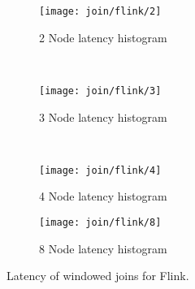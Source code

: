 \begin{figure*}
    \centering
    \begin{subfigure}[b]{0.49\textwidth}
        \texttt{[image: join/flink/2]}
        \caption{2 Node latency histogram}
    \end{subfigure}
    ~ %
    \begin{subfigure}[b]{0.49\textwidth}
        \texttt{[image: join/flink/3]}
        \caption{3 Node latency histogram}
    \end{subfigure}
    ~ %
    \begin{subfigure}[b]{0.49\textwidth}
        \texttt{[image: join/flink/4]}
        \caption{4 Node latency histogram}
    \end{subfigure}
        \begin{subfigure}[b]{0.49\textwidth}
        \texttt{[image: join/flink/8]}
        \caption{8 Node latency histogram}
    \end{subfigure}



    \label{fig_flink_agg_1}
        \caption{Latency of windowed joins for Flink.}
\end{figure*}
